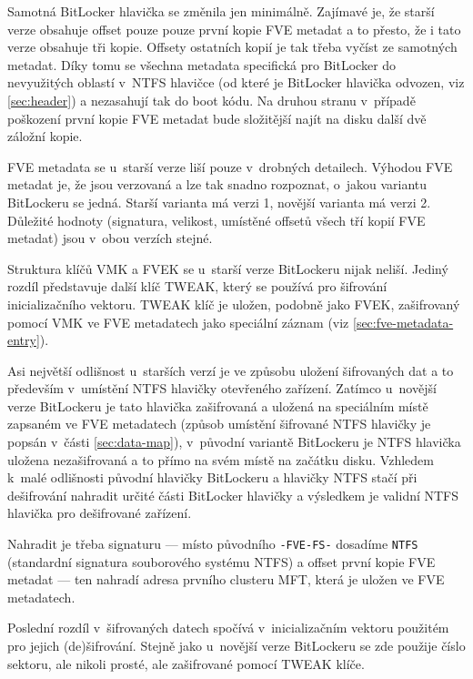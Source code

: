 Samotná BitLocker hlavička se změnila jen minimálně. Zajímavé je, že starší verze obsahuje offset pouze pouze první kopie FVE metadat a to přesto, že i tato verze obsahuje tři kopie. Offsety ostatních kopií je tak třeba vyčíst ze samotných metadat. Díky tomu se všechna metadata specifická pro BitLocker  do nevyužitých oblastí v~NTFS hlavičce (od které je BitLocker hlavička odvozen, viz \ref{sec:header}) a nezasahují tak do boot kódu. Na druhou stranu v~případě poškození první kopie FVE metadat bude složitější najít na disku další dvě záložní kopie.


FVE metadata se u~starší verze liší pouze v~drobných detailech. Výhodou FVE metadat je, že jsou verzovaná a lze tak snadno rozpoznat, o~jakou variantu BitLockeru se jedná. Starší varianta má verzi 1, novější varianta má verzi 2. Důležité hodnoty (signatura, velikost, umístěné offsetů všech tří kopií FVE metadat) jsou v~obou verzích stejné.


Struktura klíčů VMK a FVEK se u~starší verze BitLockeru nijak neliší. Jediný rozdíl představuje další klíč TWEAK, který se používá pro šifrování inicializačního vektoru. TWEAK klíč je uložen, podobně jako FVEK, zašifrovaný pomocí VMK ve FVE metadatech jako speciální záznam (viz \ref{sec:fve-metadata-entry}).


Asi největší odlišnost u~starších verzí je ve způsobu uložení šifrovaných dat a to především v~umístění NTFS hlavičky otevřeného zařízení. Zatímco u~novější verze BitLockeru je tato hlavička zašifrovaná a uložená na speciálním místě zapsaném ve FVE metadatech (způsob umístění šifrované NTFS hlavičky je popsán v~části \ref{sec:data-map}), v~původní variantě BitLockeru je NTFS hlavička uložena nezašifrovaná a to přímo na svém  místě na začátku disku. Vzhledem k~malé odlišnosti původní hla\-vič\-ky BitLockeru a hlavičky NTFS stačí při dešifrování nahradit určité části BitLocker hlavičky a výsledkem je validní NTFS hlavička pro dešifrované zařízení. 

Nahradit je třeba signaturu --- místo původního \texttt{-FVE-FS-} dosadíme \texttt{NTFS} (standardní signatura souborového systému NTFS) a offset první kopie FVE metadat --- ten nahradí adresa prvního clusteru MFT, která je uložen ve FVE metadatech.\cite{Metz2011}

Poslední rozdíl v~šifrovaných datech spočívá v~inicializačním vektoru použitém pro jejich (de)šifrování. Stejně jako u~novější verze BitLockeru se zde použije číslo sektoru, ale nikoli prosté, ale zašifrované pomocí TWEAK klíče.


